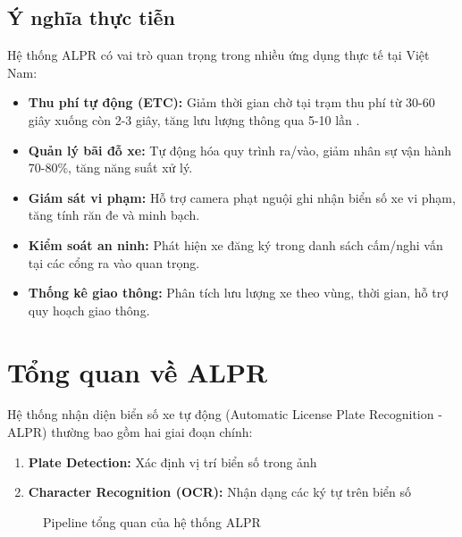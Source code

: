 \subsection{Ý nghĩa thực tiễn}
Hệ thống ALPR có vai trò quan trọng trong nhiều ứng dụng thực tế tại Việt Nam:

\begin{itemize}
    \item \textbf{Thu phí tự động (ETC):} Giảm thời gian chờ tại trạm thu phí từ 30-60 giây xuống còn 2-3 giây, tăng lưu lượng thông qua 5-10 lần \cite{vtc2024etc}.
    \item \textbf{Quản lý bãi đỗ xe:} Tự động hóa quy trình ra/vào, giảm nhân sự vận hành 70-80\%, tăng năng suất xử lý.
    \item \textbf{Giám sát vi phạm:} Hỗ trợ camera phạt nguội ghi nhận biển số xe vi phạm, tăng tính răn đe và minh bạch.
    \item \textbf{Kiểm soát an ninh:} Phát hiện xe đăng ký trong danh sách cấm/nghi vấn tại các cổng ra vào quan trọng.
    \item \textbf{Thống kê giao thông:} Phân tích lưu lượng xe theo vùng, thời gian, hỗ trợ quy hoạch giao thông.
\end{itemize}

\section{Tổng quan về ALPR}
Hệ thống nhận diện biển số xe tự động (Automatic License Plate Recognition - ALPR) thường bao gồm hai giai đoạn chính:
\begin{enumerate}
    \item \textbf{Plate Detection:} Xác định vị trí biển số trong ảnh
    \item \textbf{Character Recognition (OCR):} Nhận dạng các ký tự trên biển số
\end{enumerate}

\begin{figure}[!htbp]
    \centering
    \caption{Pipeline tổng quan của hệ thống ALPR}
    \label{fig:alpr_pipeline}
\end{figure}


